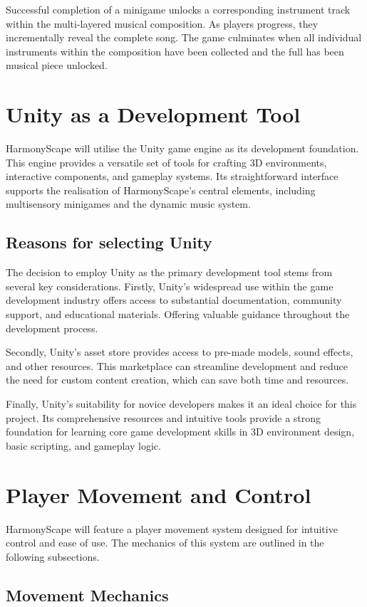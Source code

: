 \documentclass{l4proj}
\begin{document}
Successful completion of a minigame unlocks a corresponding instrument track within the multi-layered musical composition. As players progress, they incrementally reveal the complete song. The game culminates when all individual instruments within the composition have been collected and the full has been musical piece unlocked.

\section{Unity as a Development Tool}
HarmonyScape will utilise the Unity game engine as its development foundation. This engine provides a versatile set of tools for crafting 3D environments, interactive components, and gameplay systems. Its straightforward interface supports the realisation of HarmonyScape's central elements, including multisensory minigames and the dynamic music system.

\subsection{Reasons for selecting Unity}
The decision to employ Unity as the primary development tool stems from several key considerations. Firstly, Unity's widespread use within the game development industry offers access to substantial documentation, community support, and educational materials. Offering valuable guidance throughout the development process.

Secondly, Unity's asset store provides access to pre-made models, sound effects, and other resources. This marketplace can streamline development and reduce the need for custom content creation, which can save both time and resources.

Finally, Unity's suitability for novice developers makes it an ideal choice for this project. Its comprehensive resources and intuitive tools provide a strong foundation for learning core game development skills in 3D environment design, basic scripting, and gameplay logic.

\section{Player Movement and Control}\label{sec:move_&_control}
HarmonyScape will feature a player movement system designed for intuitive control and ease of use. The mechanics of this system are outlined in the following subsections.

\subsection{Movement Mechanics}
\end{document}
